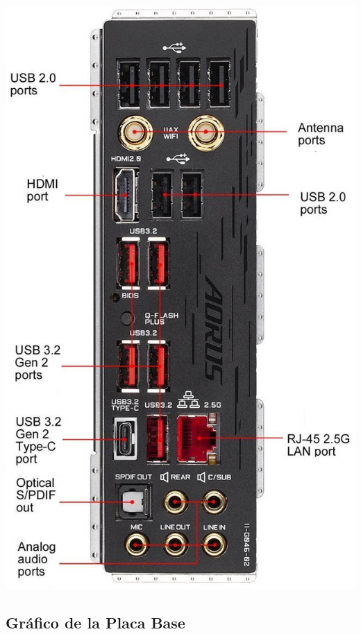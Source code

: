 \documentclass{article}
\begin{document}
\begin{itemize}
\begin{minipage}{\textwidth}
            \includegraphics[scale=0.4]{img/frontal_vertical.jpg}
          \end{minipage}
        \end{itemize}
  \newpage

    \subsection{Gráfico de la Placa Base}
\end{document}
